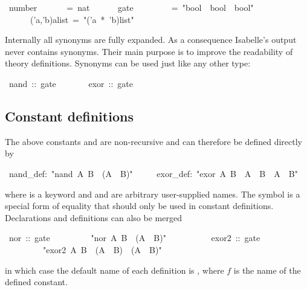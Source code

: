 \begin{isabelle}%
~number~~~~~~~=~nat\isanewline
~~~~~~gate~~~~~~~~~=~{"}bool~{\isasymRightarrow}~bool~{\isasymRightarrow}~bool{"}\isanewline
~~~~~~('a,'b)alist~=~{"}('a~*~'b)list{"}%
\begin{isamarkuptext}%
\noindent{}%
Internally all synonyms are fully expanded.  As a consequence Isabelle's
output never contains synonyms.  Their main purpose is to improve the
readability of theory definitions.  Synonyms can be used just like any other
type:%
\end{isamarkuptext}%
~nand~::~gate\isanewline
~~~~~~~exor~::~gate%
\begin{isamarkuptext}%
\subsection{Constant definitions}
\label{sec:ConstDefinitions}

The above constants  and  are non-recursive and can
therefore be defined directly by%
\end{isamarkuptext}%
~nand\_def:~{"}nand~A~B~{\isasymequiv}~{\isasymnot}(A~{\isasymand}~B){"}\isanewline
~~~~~exor\_def:~{"}exor~A~B~{\isasymequiv}~A~{\isasymand}~{\isasymnot}B~{\isasymor}~{\isasymnot}A~{\isasymand}~B{"}%
\begin{isamarkuptext}%
\noindent%
where  is a keyword and  and
 are arbitrary user-supplied names.
The symbol  is a special form of equality
that should only be used in constant definitions.
Declarations and definitions can also be merged%
\end{isamarkuptext}%
~nor~::~gate\isanewline
~~~~~~~~~{"}nor~A~B~{\isasymequiv}~{\isasymnot}(A~{\isasymor}~B){"}\isanewline
~~~~~~~~~~exor2~::~gate\isanewline
~~~~~~~~~{"}exor2~A~B~{\isasymequiv}~(A~{\isasymor}~B)~{\isasymand}~({\isasymnot}A~{\isasymor}~{\isasymnot}B){"}%
\begin{isamarkuptext}%
\noindent{}%
in which case the default name of each definition is , where
$f$ is the name of the defined constant.%
\end{isamarkuptext}%
\end{isabelle}%
